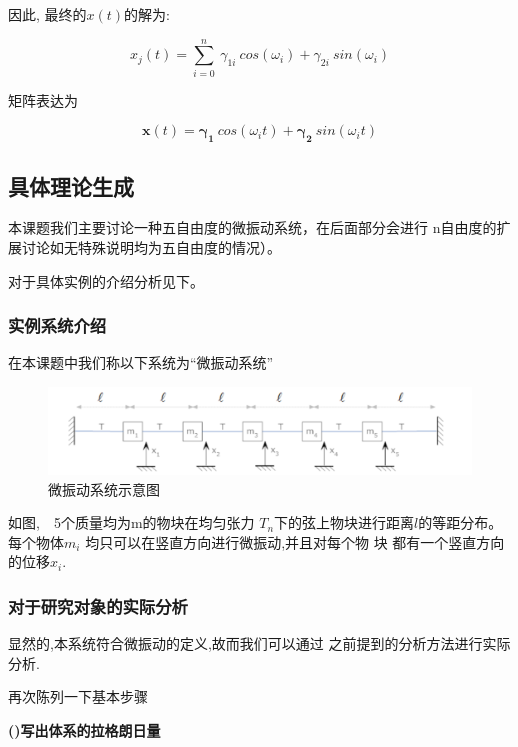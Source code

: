 \documentclass[11pt, a4paper, oneside]{ctexart}
\begin{document}
{因此, 最终的$x(t)$的解为:

\begin{equation}
    x_j(t)=\sum_{i=0}^n \ {\gamma_{1i}}\ cos(\omega_i)+{\gamma_{2i}}\ sin(\omega_i)
\end{equation}

矩阵表达为

\begin{equation}
    \bm x(t)=\bm{\gamma_{1}}\ cos(\omega_it)+\bm{\gamma_{2}}\ sin(\omega_it)
\end{equation}

\subsection{具体理论生成}

本课题我们主要讨论一种五自由度的微振动系统，在后面部分会进行
n自由度的扩展讨论如无特殊说明均为五自由度的情况）。

对于具体实例的介绍分析见下。


\subsubsection{实例系统介绍}
在本课题中我们称以下系统为“微振动系统”
\begin{figure}[!ht]
	
    \centering
    \vspace{4mm}
    \includegraphics[scale=0.2]{11.png}
    \caption{微振动系统示意图}
\end{figure} 

如图,\ \ 5个质量均为m的物块在均匀张力
$T_n$下的弦上物块进行距离$l$的等距分布。每个物体$m_i$
均只可以在竖直方向进行微振动,并且对每个物
块
都有一个竖直方向的位移$ x _i$.
\subsubsection{对于研究对象的实际分析}

显然的,本系统符合微振动的定义,故而我们可以通过
之前提到的分析方法进行实际分析.

再次陈列一下基本步骤


\textbf{()写出体系的拉格朗日量}

}
\end{document}
